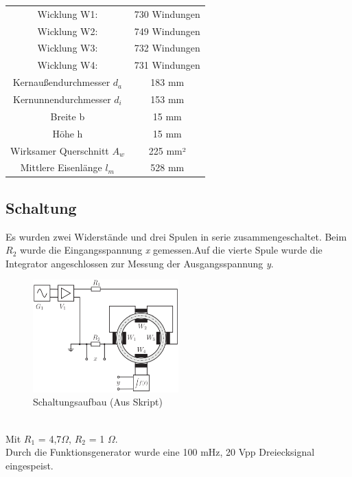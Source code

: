 \documentclass[a4paper,twoside,12pt,DIV=13,BCOR=5mm,numbers=noenddot,cleardoublepage=empty]{scrbook}
\begin{document}
    \begin{center}
        
    \begin{tabular}{cc}
    Wicklung W1: & 730 Windungen \\
    Wicklung W2: & 749 Windungen \\
    Wicklung W3: & 732 Windungen \\
    Wicklung W4: & 731 Windungen \\
    Kernaußendurchmesser $d_a$ & 183 mm \\
    Kernunnendurchmesser $d_i$ & 153 mm \\
    Breite b & 15 mm \\
    Höhe h & 15 mm \\
    Wirksamer Querschnitt $A_w$ & 225 mm² \\
    Mittlere Eisenlänge $l_m$ & 528 mm \\
    \end{tabular}
    \end{center}
    
    \subsection{Schaltung}

    Es wurden zwei Widerstände und drei Spulen in serie zusammengeschaltet. Beim \textit{$R_2$} wurde die Eingangsspannung \textit{x} gemessen.Auf die vierte Spule wurde die Integrator angeschlossen zur Messung der Ausgangsspannung \textit{y}.
    \begin{figure}[h] 
    \centering
    \includegraphics[width=0.5\textwidth]{pictures/HystereseSchaltung.png} %
    \caption{Schaltungsaufbau (Aus Skript)}
    \end{figure}
    \\
    Mit $R_1$ = 4,7$\Omega$, $R_2$ = 1 $\Omega$. \\
    Durch die Funktionsgenerator wurde eine 100 mHz, 20 Vpp Dreiecksignal eingespeist.
\end{document}
